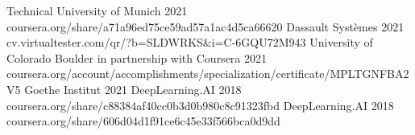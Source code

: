 

\begin{cvhonors}
    {Technical University of Munich}
    {}
    {2021}
    {coursera.org/share/a71a96ed75ce59ad57a1ac4d5ca66620}
    {Dassault Syst\`emes}
    {}
    {2021}
    {cv.virtualtester.com/qr/?b=SLDWRKS\&i=C-6GQU72M943}
    {University of Colorado Boulder in partnership with Coursera}
    {}
    {2021}
    {coursera.org/account/accomplishments/specialization/certificate/MPLTGNFBA2V5}
    {Goethe Institut}
    {}
    {2021}
    {}
    {DeepLearning.AI}
    {}
    {2018}
    {coursera.org/share/c88384af40cc0b3d0b980c8c91323fbd}
    {DeepLearning.AI}
    {}
    {2018}
    {coursera.org/share/606d04d1f91ce6c45e33f566bca0d9dd}
\end{cvhonors}
